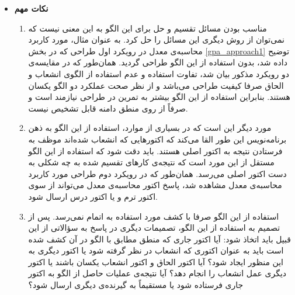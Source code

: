 \begin{itemize}
\item\textbf{نکات مهم}\\
\begin{enumerate}
\item مناسب بودن مسائل تقسیم و حل برای این الگو به این معنی نیست که نمی‌توان از روش دیگری این مسائل را حل کرد. به عنوان مثال، مورد کاربرد محاسبه‌ی معدل در رویکرد  اول طراحی که در بخش \ref{gpa_approach1} توضیح داده شد، بدون استفاده از این الگو طراحی گردید. همان‌طور که در مقایسه‌ی دو رویکرد مذکور بیان شد، تفاوت استفاده و عدم استفاده از الگوی انشعاب و الحاق صرفا کیفیت طراحی می‌باشد و از نظر صحت عملکرد دو الگو یکسان هستند. بنابراین استفاده از این الگو بیشتر به تمرین در طراحی نیازمند است و صرفاً از روی منطق دامنه قابل تشخیص نیست.
\item مورد دیگر این است که در بسیاری از موارد، استفاده از این الگو به ذهن برنامه‌نویس این طور القا می‌کند که اکتورهایی که انشعاب شده‌اند موظف به فرستادن نتیجه به اکتور اصلی هستند. باید دقت شود که استفاده از این الگو مستقل از این مورد است که نتیجه‌ی کارهای تقسیم شده به چه شکلی به دست اکتور اصلی می‌رسد. همان‌طور که در رویکرد دوم طراحی مورد کاربرد محاسبه‌ی معدل مشاهده شد، پاسخ اکتور محاسبه‌ی معدل می‌تواند از سوی اکتور ترم و یا اکتور درس ارسال شود.
\item استفاده از این الگو صرفا با کشف مورد استفاده به اتمام نمی‌رسد. پس از تصمیم به استفاده از این الگو، تصمیمات دیگری در پاسخ به سؤالاتی از این قبیل باید اتخاذ شود: آیا  اکتور جاری که منطق مطابق با الگو در آن کشف شده است باید به عنوان اکتوری که انشعاب در نظر گرفته شود یا اکتور دیگری به این منظور ایجاد شود؟ آیا اکتور الحاق و اکتور انشعاب یکسان باشند یا اکتور دیگری عمل انشعاب را انجام دهد؟ آیا نتیجه‌ی عملیات حاصل از الگو به اکتور جاری فرستاده شود یا مستقیماً به گیرنده‌ی دیگری ارسال شود؟ 
\end{enumerate} 

\end{itemize}
